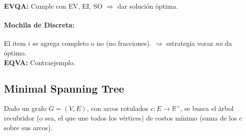 \documentclass[english, spanish, fleqn, 10pt]{article}
\numberwithin{equation}{section}
\newcommand{\nparentesis}[1]{\left( #1 \right)}
\theoremstyle{definition}
\begin{document}
\textbf{EVQA:} Cumple con EV, EI, SO $\Rightarrow$ dar solución óptima.

\paragraph{Mochila de Discreta:} El item $i$ se agrega completo o no (no fracciones). $\rightsquigarrow$ estrategia voraz \emph{no}  da óptimo.\\[-1em]

\textbf{EQVA: } Contraejemplo.

\subsection{Minimal Spanning Tree}
Dado un grafo $G=\nparentesis{V, E}$, con arcos rotulados $c:E\rightarrow \mathbb{R}^+$, se busca el árbol recubridor (o sea, el que une todos los vértices) de costos mínimo (suma de los $c$ sobre sus arcos).	
\end{document}
